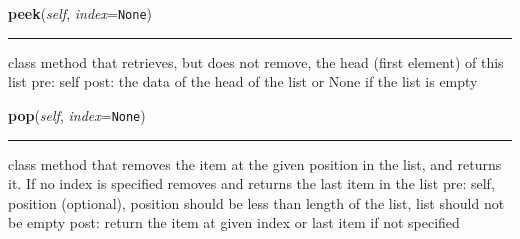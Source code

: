     \label{coinor:blimpy:LinkedList':LinkedList:peek}

    \vspace{0.5ex}

\hspace{.8\funcindent}\begin{boxedminipage}{\funcwidth}

    \raggedright \textbf{peek}(\textit{self}, \textit{index}={\tt None})

    \vspace{-1.5ex}

    \rule{\textwidth}{0.5\fboxrule}
\setlength{\parskip}{2ex}
    class method that retrieves, but does not remove, the head (first 
    element) of this list pre: self post: the data of the head of the list 
    or None if the list is empty

\setlength{\parskip}{1ex}
    \end{boxedminipage}

    \label{coinor:blimpy:LinkedList':LinkedList:pop}

    \vspace{0.5ex}

\hspace{.8\funcindent}\begin{boxedminipage}{\funcwidth}

    \raggedright \textbf{pop}(\textit{self}, \textit{index}={\tt None})

    \vspace{-1.5ex}

    \rule{\textwidth}{0.5\fboxrule}
\setlength{\parskip}{2ex}
    class method that removes the item at the given position in the list, 
    and returns it. If no index is specified removes and returns the last 
    item in the list pre: self, position (optional), position should be 
    less than length of the list, list should not be empty post: return the
    item at given index or last item if not specified

\setlength{\parskip}{1ex}
    \end{boxedminipage}

